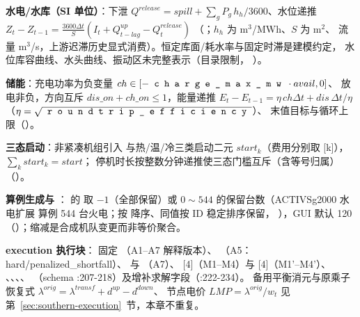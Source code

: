 \textbf{水电/水库（SI 单位）}：下泄 $Q^{release}=spill+\sum_g P_g\,h_h/3600$、水位递推
$Z_t-Z_{t-1}=\frac{3600\Delta t}{S}(I_t+Q^{up}_{t-lag}-Q^{release}_t)$
（；$h_h$ 为 m$^3$/MWh、$S$ 为 m$^2$、
流量 m$^3$/s，上游迟滞历史显式消费）。恒定库面/耗水率与固定时滞是建模约定，
水位库容曲线、水头曲线、振动区未完整表示（目录限制，
）。

\textbf{储能}：充电功率为负变量 $ch\in[-\fld{charge\_max\_mw}\cdot avail,0]$、
放电非负，方向互斥 $dis\_on+ch\_on\le1$，能量递推
$E_t-E_{t-1}=\eta\,ch\Delta t+dis\,\Delta t/\eta$（$\eta=\sqrt{\fld{roundtrip\_efficiency}}$）、
末值目标与循环上限（）。

\textbf{三态启动}：非紧凑机组引入  与热/温/冷三类启动二元
$start_k$（费用分别取 [k]），$\sum_k start_k=start$；
停机时长按整数分钟递推使三态门槛互斥（含等号归属）
（）。

\textbf{算例生成与 }： 的
 取 $-1$（全部保留）或 $0\sim544$ 的保留台数（ACTIVSg2000 水电扩展
算例 544 台火电；按  降序、同值按 ID 稳定排序保留，
），GUI 默认 120
（）；缩减是合成机队变更而非等价聚合。

\textbf{execution 执行块}： 固定
（A1--A7 解释版本）、
（A5：hard/\allowbreak penalized\_shortfall）、
 与 （A7）、
[4]（M1--M4）与 [4]（M1'--M4'）、
、、、、
（schema :207-218）及增补求解字段（:222-234）。
备用平衡消元与原乘子恢复式 $\lambda^{orig}=\lambda^{transf}+d^{up}-d^{down}$、
节点电价 $LMP=\lambda^{orig}/w_t$ 见第~\ref{sec:southern-execution}~节，本章不重复。

